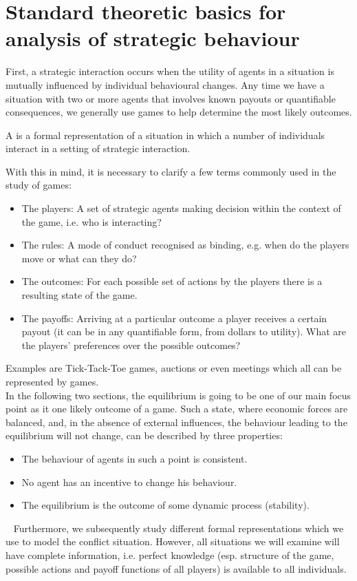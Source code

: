 

\chapter{Standard theoretic basics for analysis of strategic behaviour}

First, a strategic interaction occurs when the utility of agents in a situation is mutually influenced by individual behavioural changes. Any time we have a situation with two or more agents that involves known payouts or quantifiable consequences, we generally use games to help determine the most likely outcomes. 

	A  is a formal representation of a situation in which a number of individuals interact in a setting of strategic interaction. 

	With this in mind, it is necessary to clarify a few terms commonly used in the study of games:
	\begin{itemize}
		\item The players: A set of strategic agents making decision within the context of the game, i.e. who is interacting?	
		\item The rules: A mode of conduct recognised as binding, e.g. when do the players move or what can they do?
		\item The outcomes: For each possible set of actions by the players there is a resulting state of the game.
		\item The payoffs: Arriving at a particular outcome a player receives a certain payout (it can be in any quantifiable form, from dollars to utility). What are the players' preferences over the possible outcomes? 
	\end{itemize}

Examples are Tick-Tack-Toe games, auctions or even meetings which all can be represented by games. \\

In the following two sections, the equilibrium is going to be one of our main focus point as it one likely outcome of a game. Such a state, where economic forces are balanced, and, in the absence of external influences, the behaviour leading to the equilibrium will not change, can be described by three properties:

\begin{itemize} 
	\item The behaviour of agents in such a point is consistent.
	\item No agent has an incentive to change his behaviour.
	\item The equilibrium is the outcome of some dynamic process (stability).
\end{itemize}

~\newline
Furthermore, we subsequently study different formal representations which we use to model the conflict situation. However, all situations we will examine will have complete information, i.e. perfect knowledge (esp. structure of the game, possible actions and payoff functions of all players) is available to all individuals. 


\newpage